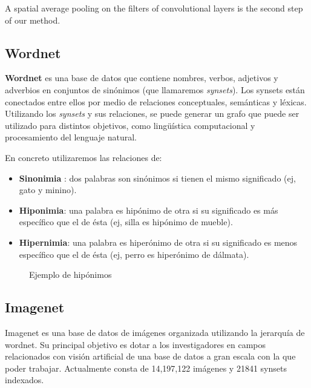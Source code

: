 \documentclass[12,twoside]{TFG-GM}
\theoremstyle{definition}
\theoremstyle{remark}
\begin{document}
A spatial average
pooling on the filters of convolutional layers is the second step of our method. 

\subsection{Wordnet}

\textbf{Wordnet} es una base de datos que contiene nombres, verbos, adjetivos y adverbios en conjuntos de sinónimos (que llamaremos \textit{synsets}). Los synsets están conectados entre ellos por medio de relaciones conceptuales, semánticas y léxicas. Utilizando los \textit{synsets} y sus relaciones, se puede generar un grafo que puede ser utilizado para distintos objetivos, como lingüística computacional y procesamiento del lenguaje natural. 

En concreto utilizaremos las relaciones de: 
\begin{itemize}

\item \textbf{Sinonimia} : dos palabras son sinónimos si tienen el mismo significado (ej, gato y minino).
\item \textbf{Hiponimia}: una palabra es hipónimo de otra si su significado es más específico que el de ésta (ej, silla es hipónimo de mueble). 
\item \textbf{Hipernimia}: una palabra es hiperónimo de otra si su significado es menos específico que el de ésta (ej, perro es hiperónimo de dálmata). 
 
\end{itemize}

\begin{figure}[H]
\centering

\caption{Ejemplo de hipónimos}
\end{figure}

\subsection{Imagenet}

Imagenet es una base de datos de imágenes organizada utilizando la jerarquía de wordnet. Su principal objetivo es dotar a los investigadores en campos relacionados con visión artificial de una base de datos a gran escala con la que poder trabajar. Actualmente consta de 14,197,122 imágenes y  21841 synsets indexados.  
\end{document}
